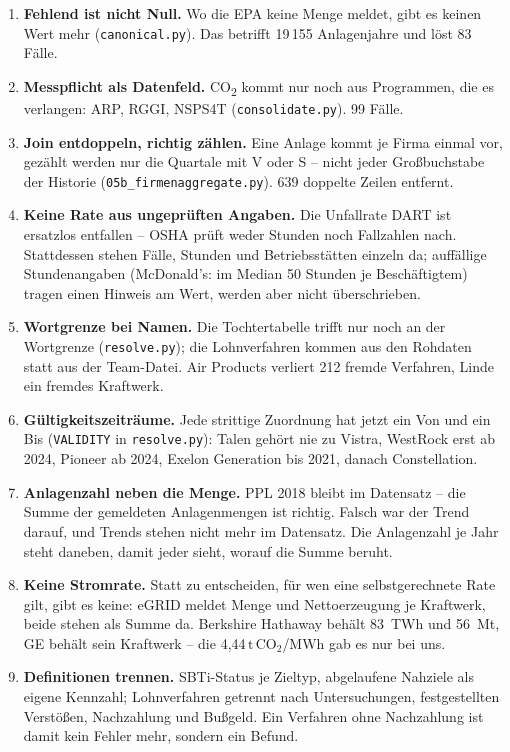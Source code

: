 \documentclass[11pt,a4paper]{article}
\newcommand{\tco}{\ensuremath{\mathrm{t\,CO}_{2}}}
\begin{document}
\begin{enumerate}
\item \textbf{Fehlend ist nicht Null.} Wo die EPA keine Menge meldet, gibt es keinen Wert mehr (\texttt{canonical.py}). Das betrifft 19\,155 Anlagenjahre und löst 83 Fälle.
\item \textbf{Messpflicht als Datenfeld.} CO\textsubscript{2} kommt nur noch aus Programmen, die es verlangen: ARP, RGGI, NSPS4T (\texttt{consolidate.py}). 99 Fälle.
\item \textbf{Join entdoppeln, richtig zählen.} Eine Anlage kommt je Firma einmal vor, gezählt werden nur die Quartale mit V oder S -- nicht jeder Großbuchstabe der Historie (\texttt{05b\_firmenaggregate.py}). 639 doppelte Zeilen entfernt.
\item \textbf{Keine Rate aus ungeprüften Angaben.} Die Unfallrate DART ist ersatzlos entfallen -- OSHA prüft weder Stunden noch Fallzahlen nach. Stattdessen stehen Fälle, Stunden und Betriebsstätten einzeln da; auffällige Stundenangaben (McDonald's: im Median 50 Stunden je Beschäftigtem) tragen einen Hinweis am Wert, werden aber nicht überschrieben.
\item \textbf{Wortgrenze bei Namen.} Die Tochtertabelle trifft nur noch an der Wortgrenze (\texttt{resolve.py}); die Lohnverfahren kommen aus den Rohdaten statt aus der Team-Datei. Air Products verliert 212 fremde Verfahren, Linde ein fremdes Kraftwerk.
\item \textbf{Gültigkeitszeiträume.} Jede strittige Zuordnung hat jetzt ein Von und ein Bis (\texttt{VALIDITY} in \texttt{resolve.py}): Talen gehört nie zu Vistra, WestRock erst ab 2024, Pioneer ab 2024, Exelon Generation bis 2021, danach Constellation.
\item \textbf{Anlagenzahl neben die Menge.} PPL 2018 bleibt im Datensatz -- die Summe der gemeldeten Anlagenmengen ist richtig. Falsch war der Trend darauf, und Trends stehen nicht mehr im Datensatz. Die Anlagenzahl je Jahr steht daneben, damit jeder sieht, worauf die Summe beruht.
\item \textbf{Keine Stromrate.} Statt zu entscheiden, für wen eine selbstgerechnete Rate gilt, gibt es keine: eGRID meldet Menge und Nettoerzeugung je Kraftwerk, beide stehen als Summe da. Berkshire Hathaway behält 83~TWh und 56~Mt, GE behält sein Kraftwerk -- die 4{,}44\,\tco{}/MWh gab es nur bei uns.
\item \textbf{Definitionen trennen.} SBTi-Status je Zieltyp, abgelaufene Nahziele als eigene Kennzahl; Lohnverfahren getrennt nach Untersuchungen, festgestellten Verstößen, Nachzahlung und Bußgeld. Ein Verfahren ohne Nachzahlung ist damit kein Fehler mehr, sondern ein Befund.

\end{enumerate}
\end{document}
